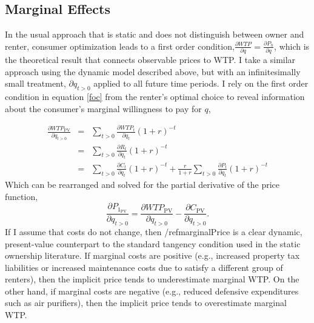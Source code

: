 \documentclass[ecta,nameyear,draft]{econsocart}
\theoremstyle{plain}
\theoremstyle{remark}
\begin{document}
\subsection{Marginal Effects}
In the usual approach that is static and does not distinguish between owner and renter, consumer optimization leads to a first order condition,$\frac{\partial{\mathit{WTP}}}{\partial q}=\frac{\partial P_h}{\partial q}$, which is the theoretical result that connects observable prices to WTP. I take a similar approach using the dynamic model described above, but with an infinitesimally small treatment, $\partial q_{t>0}$ applied to all future time periods. I rely on the first order condition in equation \ref{foc} from the renter's optimal choice to reveal information about the consumer's marginal willingness to pay for $q$,

\begin{eqnarray}
\frac{\partial \mathit{WTP}_{\mathrm{PV}}}{\partial q_{t>0}}&=&\sum_{t>0} \frac{\partial \mathit{WTP}_t}{\partial q_t}(1+r)^{-t}\label{pvmwtp}\nonumber\\ 
&=&\sum_{t>0} \frac{\partial R_t}{\partial q_t}(1+r)^{-t}\nonumber\\
&=&\sum_{t>0} \frac{\partial C_t}{\partial q_t}(1+r)^{-t}+\frac{r}{1+r}\sum_{t>0} \frac{\partial P_t}{\partial q_t}(1+r)^{-t}\nonumber
\end{eqnarray}
Which can be rearranged and solved for the partial derivative of the price function,
\begin{equation}
	\frac{\partial P_{1_{\mathrm{PV}}}} {\partial q_{t>0}}=\frac{\partial \mathit{WTP}_{\mathrm{PV}}}{\partial q_{t>0}}-\frac{\partial C_{\mathrm{PV}}}{\partial q_{t>0}} \label{marginalPrice}.
\end{equation}
If I assume that costs do not change, then /ref{marginalPrice} is a clear dynamic, present-value counterpart to the standard tangency condition used in the static ownership literature. If marginal costs are positive (e.g., increased property tax liabilities or increased maintenance costs due to satisfy a different group of renters), then the implicit price tends to underestimate marginal WTP. On the other hand, if marginal costs are negative (e.g., reduced defensive expenditures such as air purifiers), then the implicit price tends to overestimate marginal WTP.
\end{document}
